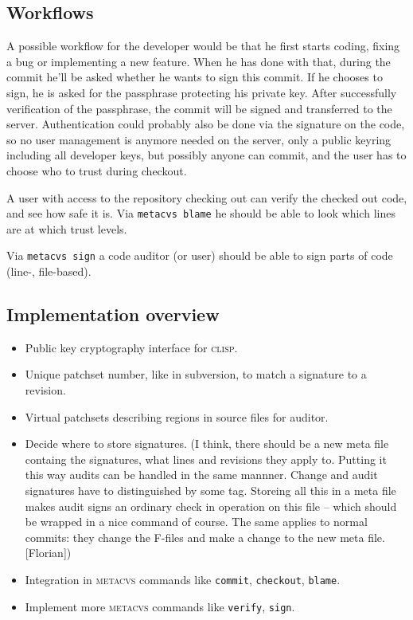 \documentclass[fleqn, 10pt, a4paper]{report}
\begin{document}
\subsection{Workflows}

A possible workflow for the developer would be that he first starts coding,
fixing a bug or implementing a new feature. When he has done with that,
during the commit he'll be asked whether he wants to sign this commit.
If he chooses to sign, he is asked for the passphrase protecting
his private key. After successfully verification of the passphrase,
the commit will be signed and transferred to the server.
Authentication could probably also be done via the signature on the code,
so no user management is anymore needed on the server, only a public keyring
including all developer keys, but possibly anyone can commit, and the user
has to choose who to trust during checkout.

A user with access to the repository checking out can verify the checked
out code, and see how safe it is.
Via \texttt{metacvs blame} he should be able to look which lines are
at which trust levels.

Via \texttt{metacvs sign} a code auditor (or user) should be able to
sign parts of code (line-, file-based).

\subsection{Implementation overview}
\begin{itemize}
\item Public key cryptography interface for \textsc{clisp}.
\item Unique patchset number, like in subversion, to match a signature to a revision.
\item Virtual patchsets describing regions in source files for auditor.
\item Decide where to store signatures.
(I think, there should be a new meta file containg the signatures, what
lines and revisions they apply to. Putting it this way audits can be handled
in the same mannner. Change and audit signatures have to distinguished by
some tag. Storeing all this in a meta file makes audit signs an
ordinary check in operation on this file -- which should be wrapped in
a nice command of course. The same applies to normal commits: they
change the F-files and make a change to the new meta file. [Florian])
\item Integration in \textsc{metacvs} commands like \texttt{commit},
\texttt{checkout}, \texttt{blame}.
\item Implement more \textsc{metacvs} commands like \texttt{verify},
\texttt{sign}.
\end{itemize}
\end{document}
